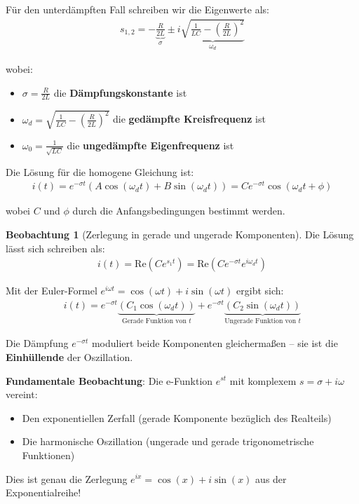 ﻿\documentclass[a4paper,12pt]{report}
\theoremstyle{definition}
\newtheorem{beobachtung}{Beobachtung}
\begin{document}
	Für den unterdämpften Fall schreiben wir die Eigenwerte als:
	\begin{align}
		s_{1,2} = -\underbrace{\frac{R}{2L}}_{\sigma} \pm i\underbrace{\sqrt{\frac{1}{LC} - \left(\frac{R}{2L}\right)^2}}_{\omega_d}
	\end{align}
	
	wobei:
	\begin{itemize}
		\item[-] $\sigma = \frac{R}{2L}$ die \textbf{Dämpfungskonstante} ist
		\item[-] $\omega_d = \sqrt{\frac{1}{LC} - \left(\frac{R}{2L}\right)^2}$ die \textbf{gedämpfte Kreisfrequenz} ist
		\item[-] $\omega_0 = \frac{1}{\sqrt{LC}}$ die \textbf{ungedämpfte Eigenfrequenz} ist
	\end{itemize}
	
	Die Lösung für die homogene Gleichung ist:
	\begin{align}
		i(t) = e^{-\sigma t} \left(A \cos(\omega_d t) + B \sin(\omega_d t)\right) = C e^{-\sigma t} \cos(\omega_d t + \phi)
	\end{align}
	
	wobei $C$ und $\phi$ durch die Anfangsbedingungen bestimmt werden.
	
	\begin{beobachtung}[Zerlegung in gerade und ungerade Komponenten]
		Die Lösung lässt sich schreiben als:
		\begin{align}
			i(t) = \text{Re}\left(C e^{s_1 t}\right) = \text{Re}\left(C e^{-\sigma t} e^{i\omega_d t}\right)
		\end{align}
		
		Mit der Euler-Formel $e^{i\omega t} = \cos(\omega t) + i\sin(\omega t)$ ergibt sich:
		\begin{align}
			i(t) = e^{-\sigma t} \underbrace{\left(C_1 \cos(\omega_d t)\right)}_{\text{Gerade Funktion von } t} + e^{-\sigma t} \underbrace{\left(C_2 \sin(\omega_d t)\right)}_{\text{Ungerade Funktion von } t}
		\end{align}
		
		Die Dämpfung $e^{-\sigma t}$ moduliert beide Komponenten gleichermaßen -- sie ist die \textbf{Einhül\-lende} der Oszillation.
		
		\textbf{Fundamentale Beobachtung}: Die e-Funktion $e^{st}$ mit komplexem $s = \sigma + i\omega$ vereint:
		\begin{itemize}
			\item[-] Den exponentiellen Zerfall (gerade Komponente bezüglich des Realteils)
			\item[-] Die harmonische Oszillation (ungerade und gerade trigonometrische Funktionen)
		\end{itemize}
		
		Dies ist genau die Zerlegung $e^{ix} = \cos(x) + i\sin(x)$ aus der Exponentialreihe!
	\end{beobachtung}
	
\end{document}
